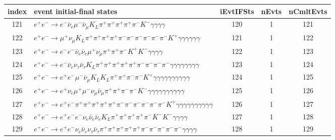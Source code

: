 \documentclass[landscape]{article}
\begin{document}
\clearpage

\begin{table}[htbp!]
\small
\centering
\begin{tabular}{|c|>{\centering}p{18cm}|c|c|c|}
\hline
index & event initial-final states & iEvtIFSts & nEvts & nCmltEvts \\
\hline
121 & $ e^{+} e^{-} \rightarrow e^{-} \bar{\nu}_{e} \mu^{-} \bar{\nu}_{\mu} K_{L} \pi^{+} \pi^{+} \pi^{+} \pi^{+} \pi^{-} K^{-} \gamma \gamma \gamma \gamma $ & 120 & 1 & 121 \\
\hline
122 & $ e^{+} e^{-} \rightarrow \mu^{+} \nu_{\mu} K_{L} \pi^{+} \pi^{+} \pi^{+} \pi^{+} \pi^{-} \pi^{-} \pi^{-} \pi^{-} \pi^{-} \pi^{-} K^{+} \gamma \gamma \gamma \gamma \gamma \gamma $ & 121 & 1 & 122 \\
\hline
123 & $ e^{+} e^{-} \rightarrow e^{-} e^{-} \bar{\nu}_{e} \bar{\nu}_{e} \mu^{+} \nu_{\mu} \pi^{+} \pi^{+} \pi^{-} K^{+} K^{-} \gamma \gamma \gamma \gamma $ & 122 & 1 & 123 \\
\hline
124 & $ e^{+} e^{-} \rightarrow e^{-} \bar{\nu}_{e} \nu_{\tau} \bar{\nu}_{\tau} K_{L} \pi^{+} \pi^{+} \pi^{+} \pi^{+} \pi^{+} \pi^{-} \pi^{-} \pi^{-} \pi^{-} \gamma \gamma \gamma \gamma \gamma \gamma \gamma \gamma $ & 123 & 1 & 124 \\
\hline
125 & $ e^{+} e^{-} \rightarrow e^{+} e^{-} \mu^{-} \bar{\nu}_{\mu} K_{L} K_{L} \pi^{+} \pi^{+} \pi^{-} \pi^{-} K^{+} \gamma \gamma \gamma \gamma \gamma \gamma \gamma \gamma \gamma \gamma $ & 124 & 1 & 125 \\
\hline
126 & $ e^{+} e^{-} \rightarrow e^{+} \nu_{e} \mu^{+} \mu^{-} \nu_{\mu} \bar{\nu}_{\mu} \pi^{+} \pi^{+} \pi^{-} \pi^{-} K^{-} \gamma \gamma \gamma \gamma \gamma \gamma \gamma \gamma \gamma \gamma $ & 125 & 1 & 126 \\
\hline
127 & $ e^{+} e^{-} \rightarrow e^{+} e^{-} \pi^{+} \pi^{+} \pi^{+} \pi^{+} \pi^{+} \pi^{-} \pi^{-} \pi^{-} \pi^{-} \pi^{-} \pi^{-} K^{+} \gamma \gamma \gamma \gamma \gamma \gamma \gamma \gamma \gamma \gamma $ & 126 & 1 & 127 \\
\hline
128 & $ e^{+} e^{-} \rightarrow e^{+} e^{-} e^{-} \nu_{e} \bar{\nu}_{e} \bar{\nu}_{e} K_{L} \pi^{+} \pi^{+} \pi^{+} \pi^{+} \pi^{-} K^{-} K^{-} \gamma \gamma \gamma \gamma $ & 127 & 1 & 128 \\
\hline
129 & $ e^{+} e^{-} \rightarrow e^{+} e^{-} \nu_{e} \bar{\nu}_{e} \nu_{\tau} \bar{\nu}_{\tau} \pi^{+} \pi^{+} \pi^{+} \pi^{+} \pi^{+} \pi^{-} \pi^{-} \pi^{-} \pi^{-} \pi^{-} \gamma \gamma \gamma \gamma $ & 128 & 1 & 129 \\

\end{tabular}
\end{table}
\end{document}

